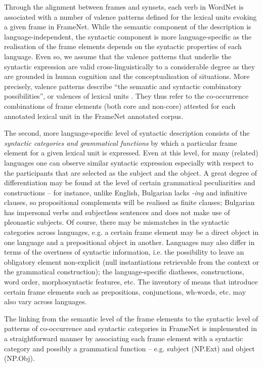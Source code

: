 \documentclass[output=paper,colorlinks,citecolor=brown]{langscibook}
\begin{document}
Through the alignment between frames and synsets, each verb in WordNet is associated with a number of valence patterns defined for the lexical units evoking a given frame in FrameNet. While the semantic component of the description is language-independent, the syntactic component is more language-specific as the realisation of the frame elements depends on the syntactic properties of each language. Even so, we assume that the valence patterns that underlie the syntactic expression are valid cross-linguistically to a considerable degree as they are grounded in human cognition and the conceptualisation of situations. More precisely, valence patterns describe ``the semantic and syntactic combinatory possibilities'', or valences of lexical units \citep[7]{Ruppenhofer2016}. They thus refer to the co-occurrence combinations of frame elements (both core and non-core) attested for each annotated lexical unit in the FrameNet annotated corpus.

The second, more language-specific level of syntactic description consists of the \emph{syntactic categories and grammatical functions} by which a particular frame element for a given lexical unit is expressed. Even at this level, for many (related) languages one can observe similar syntactic expression especially with respect to the participants that are selected as the subject and the object. A great degree of differentiation may be found at the level of certain grammatical peculiarities and constructions -- for instance, unlike English, Bulgarian lacks \textit{-ing} and infinitive clauses, so propositional complements will be realised as finite clauses; Bulgarian has impersonal verbs and subjectless sentences and does not make use of pleonastic subjects. Of course, there may be mismatches in the syntactic categories across languages, e.g. a certain frame element may be a direct object in one language and a prepositional object in another. Languages may also differ in terms of the overtness of syntactic information, i.e. the possibility to leave an obligatory element non-explicit (null instantiations retrievable from the context or the grammatical construction); the language-specific diatheses, constructions, word order, morphosyntactic features, etc. The inventory of means that introduce certain frame elements such as prepositions, conjunctions, wh-words, etc. may also vary across languages. 
 
The linking from the semantic level of the frame elements to the syntactic level of patterns of co-occurrence and syntactic categories in FrameNet is implemented in a straightforward manner by associating each frame element with a syntactic category and possibly a grammatical function -- e.g. subject (NP.Ext) and object (NP.Obj). 
\end{document}

